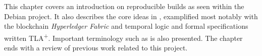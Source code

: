 \documentclass[english, biblatex, digitaloutput]{kththesis}
\begin{document}

This chapter covers an introduction on reproducible builds as seen within the Debian project. It also describes the core ideas in , examplified most notably with the blockchain \textit{Hyperledger Fabric} and temporal logic and formal specifications written TLA\textsuperscript+. Important terminology such as  is also presented. The chapter ends with a review of previous work related to this project.





\end{document}
